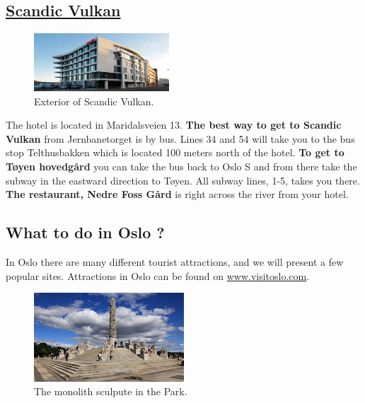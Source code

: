 \documentclass{article}
\begin{document}
\subsection*{\underline{Scandic Vulkan}}
\begin{figure}
\centering
\includegraphics[width=0.45\textwidth, height=0.3\textwidth]{img/scandic-vulkan.jpg}
\caption{\label{fig:frog1}Exterior of Scandic Vulkan.}
\end{figure}
The hotel is located in Maridalsveien 13.
\textbf{The best way to get to Scandic Vulkan} from
Jernbanetorget is by bus. Lines 34 and 54 will take you
to the bus stop Telthusbakken which is located 100 meters
north of the hotel. \textbf{To get to Tøyen hovedgård}
you can take the bus back to Oslo S and from there take
the subway in the eastward direction to Tøyen. All subway
lines, 1-5, takes you there. \textbf{The restaurant, Nedre Foss Gård}
is right across the river from your hotel.



\clearpage
\begin{center}


\section*{What to do in Oslo ?}
In Oslo there are many different tourist attractions, and we will present a few  popular sites. Attractions in Oslo can be found on \href{www.visitoslo.com}{www.visitoslo.com}.


\end{center}
\begin{figure}
    \centering
    \captionsetup{width=0.4\textwidth}
    \includegraphics[width=0.5\textwidth]{img/Vigelansparken.jpg}%
     \caption{The monolith sculpute in the Park.}
\end{figure}
\end{document}
